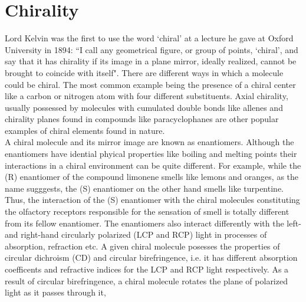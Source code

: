 
\section{Chirality}
Lord Kelvin was the first to use the word `chiral' at a lecture he gave at Oxford 
University in 1894: ``I call any geometrical figure, or group of points, 
`chiral', and say that it has chirality if its image in a plane mirror, ideally realized, 
cannot be brought to coincide with itself"\cite{}. There are different ways in which a molecule 
could be chiral. The most common example being the presence of a chiral center 
like a carbon or nitrogen atom with four different substituents. Axial chirality, usually 
possessed by molecules with cumulated double bonds like allenes and chirality planes 
found in compounds like paracyclophanes are other popular examples of chiral elements 
found in nature. \\
A chiral molecule and its mirror image are known as enantiomers. Although the
enantiomers have idential phyical properties like boiling and melting points their
interactions in a chiral environment can be quite different. For example,
while the (R) enantiomer of the compound limonene smells like lemons and oranges,
as the name sugggests, the (S) enantiomer on the other hand smells like turpentine. 
Thus, the interaction of the (S) enantiomer with the chiral molecules constituting the olfactory receptors 
responsible for the sensation of smell is totally different from its fellow enantiomer.
The enantiomers also interact differently with the left- and right-hand circularly polarized (LCP and
RCP) light in processes of absorption, refraction etc. A given chiral molecule posesses the 
properties of circular dichroism (CD) and circular birefringence, i.e. it has different absorption 
coefficents and refractive indices for the LCP and RCP light respectively. As a result of circular 
birefringence, a chiral molecule rotates the plane of polarized light as it passes through it,
